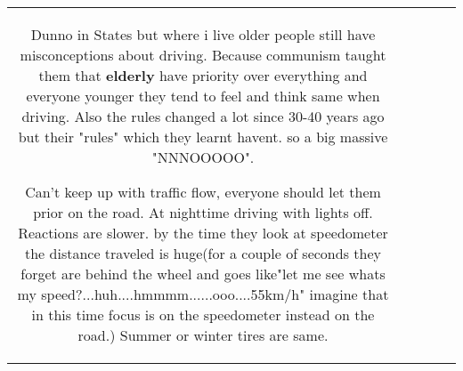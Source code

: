 \documentclass[11pt]{article}
\newlength\mylength
\begin{document}
\begin{center}
\begin{longtable}{|C{.65\mylength}|C{.30\mylength}|C{.12\mylength}|C{.12\mylength}|C{.12\mylength}|}
  \small Dunno in States but where i live older people still have misconceptions about driving. Because communism taught them that \textbf{elderly} have priority over everything and everyone younger they tend to feel  and think same when driving. Also the rules changed a lot since 30-40 years ago but their "rules" which they learnt havent. so a big massive "NNNOOOOO".

Can't keep up with traffic flow, everyone should let them prior on the road. At nighttime driving with lights off. Reactions are slower. by the time they look at speedometer the distance traveled is huge(for a couple of seconds they forget are behind the wheel and goes like"let me see whats my speed?...huh....hmmmm......ooo....55km/h" imagine that in this time focus is on the speedometer instead on the road.) Summer  or winter tires are same. 


\end{longtable}
\end{center}
\end{document}
